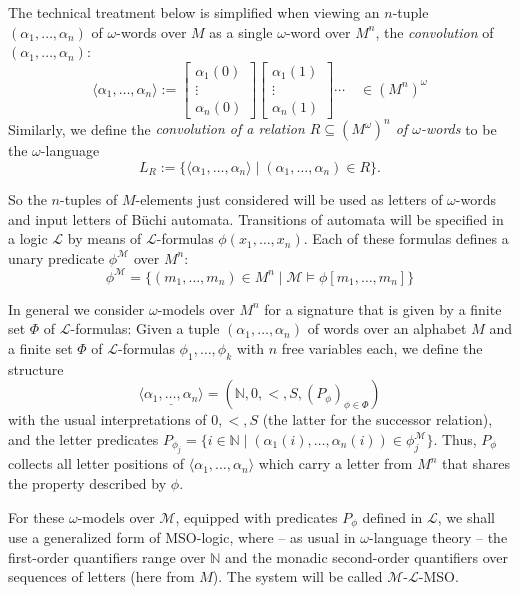 \documentclass[copyright,creativecommons]{eptcs}
\theoremstyle{plain}
\theoremstyle{nonumberplain}
\newcommand{\m}{\ensuremath{\mathcal{M}}}
\newcommand{\el}{\ensuremath{\mathcal{L}}}
\newcommand{\ml}{\ensuremath{\m\textrm{-}\el}}
\begin{document}
The technical treatment below is simplified when viewing an $n$-tuple $(\alpha_1, \ldots, \alpha_n)$ 
of $\omega$-words 
over $M$ as a single $\omega$-word over $M^n$, the \emph{convolution} of 
$(\alpha_1,\dots,\alpha_n)$:  $$ \langle \alpha_1, \ldots, \alpha_n \rangle := \begin{bmatrix}  \alpha_1(0)\\ \vdots\\ \alpha_n(0) \end{bmatrix} 
\begin{bmatrix} \alpha_1(1)\\ \vdots\\ \alpha_n(1)\end{bmatrix} \cdots \quad \in (M^n)^{\omega}
$$
Similarly, we define the \emph{convolution of a relation $R \subseteq (M^{\omega})^n$ of 
$\omega$-words} to be the $\omega$-language 
$$L_R := \{ \langle \alpha_1, \ldots, \alpha_n \rangle  \mid 
(\alpha_1, \ldots, \alpha_n) \in R\}. $$

So the $n$-tuples of $M$-elements just considered will be used as 
letters of $\omega$-words and input letters of B\"uchi automata. Transitions 
of automata will be specified in a logic $\el$ by means of 
$\el$-formulas $\phi(x_1, \ldots, x_n)$. Each of these 
formulas defines a unary predicate $\phi^\m$ over $M^n$:  
$$\phi^\m = \{(m_1, \ldots, m_n) \in M^n \mid \m \models \phi[m_1, \ldots, m_n]\}$$

In general we consider $\omega$-models over $M^n$ for a signature that is given by a 
finite set $\Phi$ of $\el$-formulas: 
Given a tuple $(\alpha_1,\ldots,\alpha_n)$ of words over an alphabet $M$ and 
a finite set $\Phi$ of $\el$-formulas $\phi_1, \ldots , \phi_k$ with $n$ free 
variables each, we define the structure 
 $$\underline{\langle \alpha_1, \ldots, \alpha_n \rangle} = 
 (\mathbb{N}, 0, <, S, (P_{\phi})_{\phi \in \Phi})$$ 
with the usual interpretations of $0, <, S$ (the latter for the successor relation), 
and the letter predicates 
$P_{\phi_j} = \{i \in \mathbb{N} \mid (\alpha_1(i),\ldots,\alpha_n(i)) \in \phi_j^\m\}$. 
 Thus,  $P_\phi$ collects all letter positions of $\langle \alpha_1, \ldots, \alpha_n \rangle$ 
 which carry a letter from $M^n$ that shares the property described by $\phi$.

For these $\omega$-models over $\m$, equipped with predicates $P_\phi$ defined 
in $\el$, we shall use a generalized form of MSO-logic, where -- as usual in $\omega$-language theory --
the first-order quantifiers range over $\mathbb{N}$ and the monadic second-order
quantifiers over sequences of letters (here from $M$). The system will be called \ml-MSO. 
\end{document}
